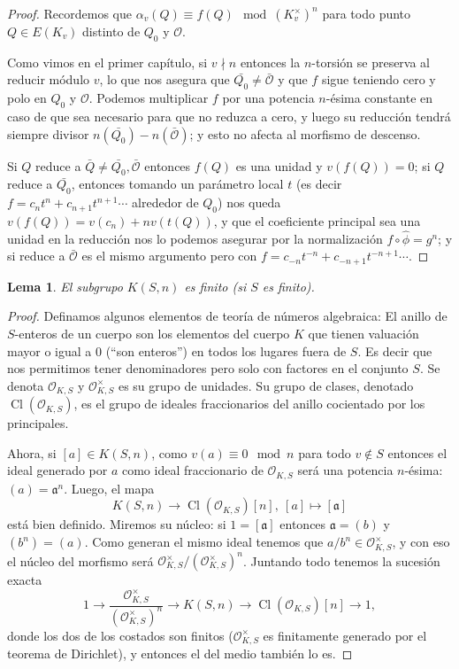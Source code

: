 \documentclass[a4paper]{book}
\theoremstyle{definition}
\theoremstyle{plain}
\newtheorem*{lemma*}{Lema}
\newcommand{\OO}{\mathcal{O}}
\newcommand{\aaa}{\mathfrak{a}}
\begin{document}
\begin{proof}
Recordemos que $\alpha_v(Q) \equiv f(Q) \mod {(K_v^\times)}^n$ para todo punto $Q\in E(K_v)$ distinto de $Q_0$ y $\OO$. 

Como vimos en el primer capítulo, si $v \nmid n$ entonces la $n$-torsión se preserva al reducir módulo $v$, lo que nos asegura que $\bar{Q_0} \neq \bar{\OO}$ y que $f$ sigue teniendo cero y polo en $Q_0$ y $\OO$. Podemos multiplicar $f$ por una potencia $n$-ésima constante en caso de que sea necesario para que no reduzca a cero, y luego su reducción tendrá siempre divisor $n(\bar{Q_0})-n(\bar{\OO})$; y esto no afecta al morfismo de descenso.

Si $Q$ reduce a $\bar{Q} \neq \bar{Q_0},\bar{\OO}$ entonces $f(Q)$ es una unidad y $v(f(Q))=0$; si $Q$ reduce a $\bar{Q_0}$, entonces tomando un parámetro local $t$ (es decir $f=c_n t^n + c_{n+1} t^{n+1}\cdots$ alrededor de $Q_0$) nos queda $v(f(Q))=v(c_n) +n v(t(Q))$, y que el coeficiente principal sea una unidad en la reducción nos lo podemos asegurar por la normalización $f\circ \hat\phi = g^n$; y si reduce a $\bar{\OO}$ es el mismo argumento pero con $f = c_{-n} t^{-n} + c_{-n+1} t^{-n+1} \cdots$. 
\end{proof}

\begin{lemma*}
El subgrupo $K(S,n)$ es finito (si $S$ es finito).
\end{lemma*}

\begin{proof}
Definamos algunos elementos de teoría de números algebraica: El anillo de $S$-enteros de un cuerpo son los elementos del cuerpo $K$ que tienen valuación mayor o igual a 0 (``son enteros'') en todos los lugares fuera de $S$. Es decir que nos permitimos tener denominadores pero solo con factores en el conjunto $S$. Se denota $\OO_{K,S}$ y $\OO_{K,S}^\times$ es su grupo de unidades. Su grupo de clases, denotado $\operatorname{Cl}(\OO_{K,S})$, es el grupo de ideales fraccionarios del anillo cocientado por los principales.

Ahora, si $[a]\in K(S,n)$, como $v(a)\equiv 0 \mod n$ para todo $v\notin S$ entonces el ideal generado por $a$ como ideal fraccionario de $\OO_{K,S}$ será una potencia $n$-ésima: $(a)=\aaa^n$. Luego, el mapa
\[
K(S,n) \to \operatorname{Cl}(\OO_{K,S})[n], \ [a]\mapsto [\aaa]
\]
está bien definido. Miremos su núcleo: si $1=[\aaa]$ entonces $\aaa=(b)$ y $(b^n) = (a)$. Como generan el mismo ideal tenemos que $a/b^n \in \OO_{K,S}^\times$, y con eso el núcleo del morfismo será $\OO_{K,S}^\times / {(\OO_{K,S}^\times)}^n$. Juntando todo tenemos la sucesión exacta
\[
1 \to \frac{\OO_{K,S}^\times}{ {(\OO_{K,S}^\times)}^n} \to K(S,n)\to \operatorname{Cl}(\OO_{K,S})[n] \to 1,
\]
donde los dos de los costados son finitos ($\OO_{K,S}^\times$ es finitamente generado por el teorema de Dirichlet), y entonces el del medio también lo es.
\end{proof}
\end{document}
